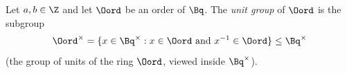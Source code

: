 Let $a,b\in\Z$ and let $\Oord$ be an order of $\Bq$. The \emph{unit group} of $\Oord$ is the subgroup
\[
  \Oord^\times=\{x\in\Bq^\times:x\in\Oord\text{ and }x^{-1}\in\Oord\}\le\Bq^\times
\]
(the group of units of the ring $\Oord$, viewed inside $\Bq^\times$).
